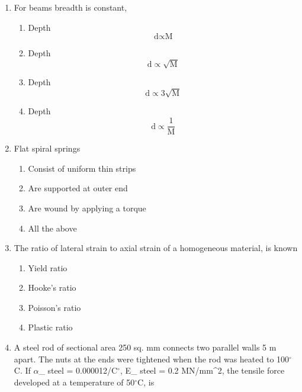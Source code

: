 \documentclass[11pt,a4paper]{article}
\begin{document}
\begin{enumerate}
\\
\item{For beams breadth is constant,}
\begin{enumerate}[label=\Alph*.]
\item{Depth $${\text{d}} \propto {\text{M}}$$}
\item{Depth $${\text{d}} \propto \sqrt {\text{M}} $$}
\item{Depth $${\text{d}} \propto 3\sqrt {\text{M}} $$}
\item{Depth $${\text{d}} \propto \frac{1}{{\text{M}}}$$}
\end{enumerate}
\item{Flat spiral springs}
\begin{enumerate}[label=\Alph*.]
\item{Consist of uniform thin strips}
\item{Are supported at outer end}
\item{Are wound by applying a torque}
\item{All the above}
\end{enumerate}
\item{The ratio of lateral strain to axial strain of a homogeneous material, is known}
\begin{enumerate}[label=\Alph*.]
\item{Yield ratio}
\item{Hooke's ratio}
\item{Poisson's ratio}
\item{Plastic ratio}
\end{enumerate}
\item{A steel rod of sectional area 250 sq. mm connects two parallel walls 5 m apart. The nuts at the ends were tightened when the rod was heated to 100$^\circ$C. If $\alpha$\_ steel = 0.000012/C$^\circ$, E\_ steel = 0.2 MN/mm\^{}2, the tensile force developed at a temperature of 50$^\circ$C, is
}
\\
\end{enumerate}
\end{document}
